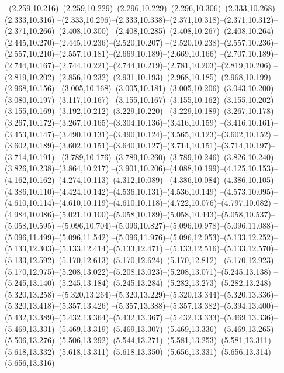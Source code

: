   --(2.259,10.216)--(2.259,10.229)--(2.296,10.229)--(2.296,10.306)--(2.333,10.268)--(2.333,10.316)%
  --(2.333,10.296)--(2.333,10.338)--(2.371,10.318)--(2.371,10.312)--(2.371,10.266)--(2.408,10.300)%
  --(2.408,10.285)--(2.408,10.267)--(2.408,10.264)--(2.445,10.270)--(2.445,10.236)--(2.520,10.207)%
  --(2.520,10.238)--(2.557,10.236)--(2.557,10.210)--(2.557,10.181)--(2.669,10.189)--(2.669,10.166)%
  --(2.707,10.189)--(2.744,10.167)--(2.744,10.221)--(2.744,10.219)--(2.781,10.203)--(2.819,10.206)%
  --(2.819,10.202)--(2.856,10.232)--(2.931,10.193)--(2.968,10.185)--(2.968,10.199)--(2.968,10.156)%
  --(3.005,10.168)--(3.005,10.181)--(3.005,10.206)--(3.043,10.200)--(3.080,10.197)--(3.117,10.167)%
  --(3.155,10.167)--(3.155,10.162)--(3.155,10.202)--(3.155,10.169)--(3.192,10.212)--(3.229,10.220)%
  --(3.229,10.189)--(3.267,10.178)--(3.267,10.172)--(3.267,10.165)--(3.304,10.136)--(3.416,10.159)%
  --(3.416,10.161)--(3.453,10.147)--(3.490,10.131)--(3.490,10.124)--(3.565,10.123)--(3.602,10.152)%
  --(3.602,10.189)--(3.602,10.151)--(3.640,10.127)--(3.714,10.151)--(3.714,10.197)--(3.714,10.191)%
  --(3.789,10.176)--(3.789,10.260)--(3.789,10.246)--(3.826,10.240)--(3.826,10.238)--(3.864,10.217)%
  --(3.901,10.206)--(4.088,10.199)--(4.125,10.153)--(4.162,10.162)--(4.274,10.113)--(4.312,10.089)%
  --(4.386,10.084)--(4.386,10.105)--(4.386,10.110)--(4.424,10.142)--(4.536,10.131)--(4.536,10.149)%
  --(4.573,10.095)--(4.610,10.114)--(4.610,10.119)--(4.610,10.118)--(4.722,10.076)--(4.797,10.082)%
  --(4.984,10.086)--(5.021,10.100)--(5.058,10.189)--(5.058,10.443)--(5.058,10.537)--(5.058,10.595)%
  --(5.096,10.704)--(5.096,10.827)--(5.096,10.978)--(5.096,11.088)--(5.096,11.499)--(5.096,11.542)%
  --(5.096,11.976)--(5.096,12.053)--(5.133,12.252)--(5.133,12.303)--(5.133,12.414)--(5.133,12.471)%
  --(5.133,12.516)--(5.133,12.570)--(5.133,12.592)--(5.170,12.613)--(5.170,12.624)--(5.170,12.812)%
  --(5.170,12.923)--(5.170,12.975)--(5.208,13.022)--(5.208,13.023)--(5.208,13.071)--(5.245,13.138)%
  --(5.245,13.140)--(5.245,13.184)--(5.245,13.284)--(5.282,13.273)--(5.282,13.248)--(5.320,13.258)%
  --(5.320,13.264)--(5.320,13.229)--(5.320,13.344)--(5.320,13.336)--(5.320,13.418)--(5.357,13.426)%
  --(5.357,13.388)--(5.357,13.382)--(5.394,13.400)--(5.432,13.389)--(5.432,13.364)--(5.432,13.367)%
  --(5.432,13.333)--(5.469,13.336)--(5.469,13.331)--(5.469,13.319)--(5.469,13.307)--(5.469,13.336)%
  --(5.469,13.265)--(5.506,13.276)--(5.506,13.292)--(5.544,13.271)--(5.581,13.253)--(5.581,13.311)%
  --(5.618,13.332)--(5.618,13.311)--(5.618,13.350)--(5.656,13.331)--(5.656,13.314)--(5.656,13.316)%
